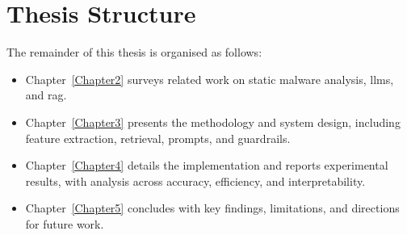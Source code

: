 \section{Thesis Structure}\label{sec:ThesisStructure}
The remainder of this thesis is organised as follows:
\begin{itemize}
	\item Chapter~\ref{Chapter2} surveys related work on static malware analysis, \glspl{llm}, and \gls{rag}.
	\item Chapter~\ref{Chapter3} presents the methodology and system design, including feature extraction,
	      retrieval, prompts, and guardrails.
	\item Chapter~\ref{Chapter4} details the implementation and reports experimental results, with analysis
	      across accuracy, efficiency, and interpretability.
	\item Chapter~\ref{Chapter5} concludes with key findings, limitations, and directions for future work.
\end{itemize}
